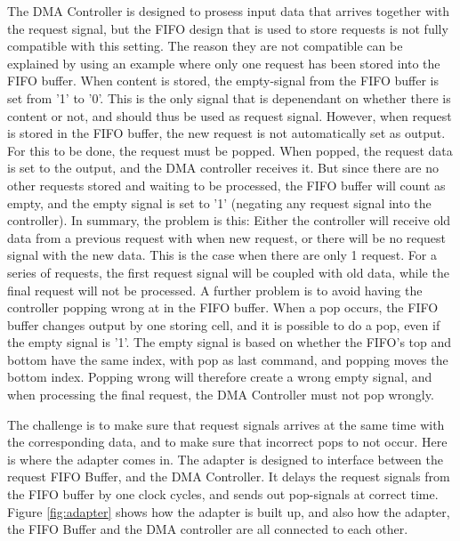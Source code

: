 \begin{appendix}
The DMA Controller is designed to prosess input data that arrives together with the request signal, but the FIFO design that is used to store requests is not fully compatible with this setting.
The reason they are not compatible can be explained by using an example where only one request has been stored into the FIFO buffer.
When content is stored, the empty-signal from the FIFO buffer is set from '1' to '0'.
This is the only signal that is depenendant on whether there is content or not, and should thus be used as request signal.
However, when request is stored in the FIFO buffer, the new request is not automatically set as output.
For this to be done, the request must be popped.
When popped, the request data is set to the output, and the DMA controller receives it.
But since there are no other requests stored and waiting to be processed, the FIFO buffer will count as empty, and the empty signal is set to '1' (negating any request signal into the controller).
In summary, the problem is this: Either the controller will receive old data from a previous request with when new request, or there will be no request signal with the new data.
This is the case when there are only 1 request.
For a series of requests, the first request signal will be coupled with old data, while the final request will not be processed.
A further problem is to avoid having the controller popping wrong at in the FIFO buffer.
When a pop occurs, the FIFO buffer changes output by one  storing cell, and it is possible to do a pop, even if the empty signal is '1'.
The empty signal is based on whether the FIFO's top and bottom have the same index, with pop as last command, and popping moves the bottom index.
Popping wrong will therefore create a wrong empty signal, and when processing the final request, the DMA Controller must not pop wrongly.

\par
The challenge is to make sure that request signals arrives at the same time with the corresponding data, and to make sure that incorrect pops to not occur.
Here is where the adapter comes in.
The adapter is designed to interface between the request FIFO Buffer, and the DMA Controller. 
It delays the request signals from the FIFO buffer by one clock cycles, and sends out pop-signals at correct time.
Figure \ref{fig:adapter} shows how the adapter is built up, and also how the adapter, the FIFO Buffer and the DMA controller are all connected to each other.



\end{appendix}
